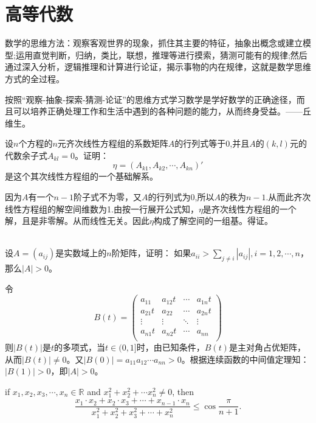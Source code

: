 \chapter{高等代数}
数学的思维方法：观察客观世界的现象，抓住其主要的特征，抽象出概念或建立模型;运用直觉判断，归纳，类比，联想，推理等进行摸索，猜测可能有的规律;然后通过深入分析，逻辑推理和计算进行论证，揭示事物的内在规律，这就是数学思维方式的全过程。

按照“观察-抽象-探索-猜测-论证”的思维方式学习数学是学好数学的正确途径，而且可以培养正确处理工作和生活中遇到的各种问题的能力，从而终身受益。——丘维生。


\begin{exercise}
\hfill
设$n$个方程的$n$元齐次线性方程组的系数矩阵$A$的行列式等于0,并且$A$的$(k,l)$元的代数余子式$A_{kl}=0$。证明：$$\eta=(A_{k1},A_{k2},\cdots,A_{kn})'$$是这个其次线性方程组的一个基础解系。


因为$A$有一个$n-1$阶子式不为零，又$A$的行列式为0,所以$A$的秩为$n-1$.从而此齐次线性方程组的解空间维数为1.由按一行展开公式知，$\eta$是齐次线性方程组的一个解，且是非零解。从而线性无关。因此$\eta$构成了解空间的一组基。得证。
\end{exercise}
\begin{exercise}
\hfill\\
设$A=(a_{ij})$是实数域上的$n$阶矩阵，证明：
如果$a_{ii}>\sum_{j\not=i}|a_{ij}|,i=1,2,\cdots,n$，那么$|A|>0$。

令
$$
B(t)=
\left(
\begin{array}{llll}
a_{11}&a_{12}t&\cdots&a_{1n}t\\
a_{21}t&a_{22}&\cdots&a_{2n}t\\
\vdots&\vdots&\ddots&\vdots\\
a_{n1}t&a_{n2}t&\cdots&a_{nn}\\
\end{array}
\right)
$$
则$|B(t)|$是$t$的多项式，当$t\in(0,1]$时，由已知条件，$B(t)$是主对角占优矩阵，从而$|B(t)|\neq0$。又$|B(0)|=a_{11}a_{12}\cdots a_{nn}>0$。根据连续函数的中间值定理知：$|B(1)|>0$，即$|A|>0$。
\end{exercise}

\begin{exercise}
    if $x_1, x_2, x_3,\cdots, x_n\in\mathbb R$ and $x_1^2+x_2^2+\cdots x_n^2\neq0$, then 
    \begin{equation*}
        \frac{x_1\cdot x_2 + x_2\cdot x_3 + \cdots + x_{n-1}\cdot x_n}{x_1^2 + x_2^2 + x_3^2 + \cdots + x_n^2} \leq \cos\frac{\pi}{n+1}.
    \end{equation*}
\end{exercise}

